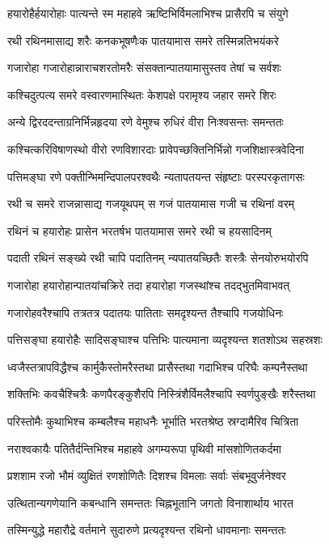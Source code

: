 \twolineshloka
{हयारोहैर्हयारोहाः पात्यन्ते स्म महाहवे}
{ऋष्टिभिर्विमलाभिश्च प्रासैरपि च संयुगे}


\twolineshloka
{रथी रथिनमासाद्य शरैः कनकभूषणैःक}
{पातयामास समरे तस्मिन्नतिभयंकरे}


\twolineshloka
{गजारोहा गजारोहान्नाराचशरतोमरैः}
{संसक्तान्पातयामासुस्तव तेषां च सर्वशः}


\twolineshloka
{कश्चिदुत्पत्य समरे वस्वारणमास्थितः}
{केशपक्षे परामृश्य जहार समरे शिरः}


\twolineshloka
{अन्ये द्विरददन्ताग्रनिर्भिन्नहृदया रणे}
{वेमुश्च रुधिरं वीरा निःश्वसन्तः समन्ततः}


\twolineshloka
{कश्चित्करिविषाणस्थो वीरो रणविशारदाः}
{प्रावेपच्छक्तिनिर्भिन्नो गजशिक्षास्त्रवेदिना}


\twolineshloka
{पत्तिमङ्घा रणे पक्तीन्भिमन्दिपालपरश्वथैः}
{न्यतापतयन्त संहृष्टाः परस्परकृतागसः}


\twolineshloka
{रथी च समरे राजन्नासाद्य गजयूथपम्}
{स गजं पातयामास गजी च रथिनां वरम्}


\twolineshloka
{रथिनं च हयारोहः प्रासेन भरतर्षभ}
{पातयामास समरे रथी च हयसादिनम्}


\twolineshloka
{पदाती रथिनं सङ्ख्ये रथी चापि पदातिनम्}
{न्यपातयच्छितैः शस्त्रैः सेनयोरुभयोरपि}


\twolineshloka
{गजारोहा हयारोहान्पातयांचक्रिरे तदा}
{हयारोहा गजस्थांश्च तदद्भुतमिवाभवत्}


\twolineshloka
{गजारोहवरैश्चापि तत्रतत्र पदातयः}
{पातिताः समदृश्यन्त तैश्चापि गजयोधिनः}


\twolineshloka
{पत्तिसङ्घा हयारोहैः सादिसङ्घाश्च पत्तिभिः}
{पात्यमाना व्यदृश्यन्त शतशोऽथ सहस्रशः}


\twolineshloka
{ध्वजैस्तत्रापविद्धैश्च कार्मुकैस्तोमरैस्तथा}
{प्रासैस्तथा गदाभिश्च परिघैः कम्पनैस्तथा}


\twolineshloka
{शक्तिभिः कवचैश्चित्रैः कणपैरङ्कुशैरपि}
{निस्त्रिंशैर्विमलैश्चापि स्वर्णपुङ्खैः शरैस्तथा}


\twolineshloka
{परिस्तोमैः कुथाभिश्च कम्बलैश्च महाधनैः}
{भूर्भाति भरतश्रेष्ठ स्रग्दामैरिव चित्रिता}


\twolineshloka
{नराश्वकायैः पतितैर्दन्तिभिश्च महाहवे}
{अगम्यरूपा पृथिवी मांसशोणितकर्दमा}


\twolineshloka
{प्रशशाम रजो भौमं व्युक्षितं रणशोणितैः}
{दिशश्च विमलाः सर्वाः संबभूवुर्जनेश्वर}


\twolineshloka
{उत्थितान्यगणेयानि कबन्धानि समन्ततः}
{चिह्नभूतानि जगतो विनाशार्थाय भारत}


\twolineshloka
{तस्मिन्युद्धे महारौद्रे वर्तमाने सुदारुणे}
{प्रत्यदृश्यन्त रथिनो धावमानाः समन्ततः}


